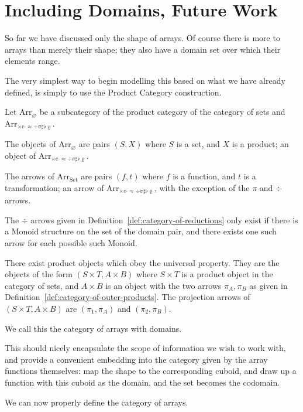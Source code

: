 \documentclass{DIKU-report-variant}
\newcommand\mrm[1]{\mathrm{#1}}
\newcommand\brm[1]{\bm{\mrm{#1}}}
\newcommand\Arr[1]{{\brm{Arr}_{\brm{#1}}}}
\newcommand\XCADSSFR{\times c\cdot\approx\div\sigma\sharp\flat\varrho}
\begin{document}
\section{Including Domains, Future Work}

So far we have discussed only the shape of arrays. Of course there is more to
arrays than merely their shape; they also have a domain set over which their elements
range.

The very simplest way to begin modelling this based on what we have already defined,
is simply to use the Product Category construction.

\begin{definition}
  \label{def:cateogry-of-arrays-with-domains}
  Let \(\Arr \varnothing\) be a subcategory of the product category of
  the category of sets and \(\Arr\XCADSSFR\).

  The objects of \(\Arr\varnothing\) are pairs \((S, X)\) where \(S\) is a set,
  and \(X\) is a product; an object of \(\Arr\XCADSSFR\).

  The arrows of \(\Arr{\brm{Set}}\) are pairs \((f, t)\) where \(f\) is a function,
  and \(t\) is a transformation; an arrow of \(\Arr\XCADSSFR\), with the exception
  of the \(\pi\) and \(\div\) arrows.
  
  The \(\div\) arrows given in Definition~\ref{def:category-of-reductions} only exist
  if there is a Monoid structure on the set of the domain pair, and there exists one
  such arrow for each possible such Monoid.

  There exist product objects which obey the universal property. They are the objects
  of the form \((S \times T, A \times B)\) where \(S\times T\) is a product object in
  the category of sets, and \(A \times B\) is an object with the two arrows \(\pi_A, \pi_B\)
  as given in Definition~\ref{def:category-of-outer-products}. The projection arrows of
  \((S\times T, A\times B)\)  are \((\pi_1, \pi_A)\) and \((\pi_2, \pi_B)\).

  We call this the category of arrays with domains.
\end{definition}

This should nicely encapsulate the scope of information we wish to work with, and provide
a convenient embedding into the category given by the array functions themselves: map
the shape to the corresponding cuboid, and draw up a function with this cuboid as the
domain, and the set becomes the codomain.

We can now properly define the category of arrays.
\end{document}
